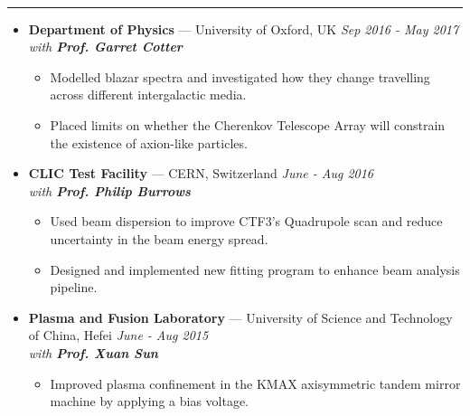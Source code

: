 \documentclass[11 pt,oneside]{article}
\newenvironment{ressection}[1]{
	\vspace{4pt}
	{\selectfont\Large\color{Mycolor2}{\textbf{#1}}}
	\vspace{-6.5pt} \\
	\textcolor{Mycolor2}{\rule{\textwidth}{0.7pt}}
	\begin{itemize}
	\vspace{3pt}
}{
	\end{itemize}
}
\newcommand{\ressubitem}{
	\vspace{-4pt}
	\item
}
\newcommand{\resbigitem}[3]{
	\vspace{-5pt}
	\item[]
	\textbf{#1} --- #2 %
	\hfill
	\textit{#3}
}
\newenvironment{ressubsec}[3]{
	\resbigitem{#1}{#2}{#3}
	\vspace{-2pt}
	\begin{itemize}
}{
	\end{itemize}
}
\begin{document}
\begin{ressection}{\textbf{Research}}
	\vspace{2pt}
	\begin{ressubsec}{Department of Physics}{University of Oxford, UK}{Sep 2016 - May 2017 \\ with \textbf{Prof. Garret Cotter}}
                 \ressubitem{Modelled blazar spectra and investigated how they change travelling across different intergalactic media.} 
                 \ressubitem{Placed limits on whether the Cherenkov Telescope Array will constrain the existence of axion-like particles.}
	\end{ressubsec}
	
	\vspace{2pt}
		
	\begin{ressubsec}{CLIC Test Facility}{CERN, Switzerland}{June - Aug 2016 \\ with \textbf{Prof. Philip Burrows}}
                 \ressubitem{Used beam dispersion to improve CTF3's Quadrupole scan and reduce uncertainty in the beam energy spread.}
                 \ressubitem{Designed and implemented new fitting program to enhance beam analysis pipeline.} 
	\end{ressubsec}
	
	\vspace{2pt}
	
	\begin{ressubsec}{Plasma and Fusion Laboratory}{University of Science and Technology of China, Hefei}{June - Aug 2015\\ with \textbf{Prof. Xuan Sun}}
                \ressubitem{Improved plasma confinement in the KMAX axisymmetric tandem mirror machine by applying a bias voltage.}
	\end{ressubsec}

\end{ressection}
\end{document}
